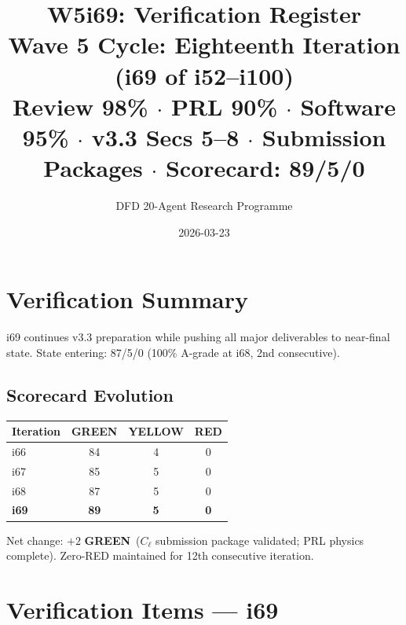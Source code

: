 \documentclass[11pt,a4paper]{article}
\title{\Large W5i69: Verification Register\\[6pt]
\normalsize Wave 5 Cycle: Eighteenth Iteration (i69 of i52--i100)\\[6pt]
Review 98\% $\cdot$ PRL 90\% $\cdot$ Software 95\% $\cdot$ v3.3 Secs 5--8 $\cdot$ Submission Packages $\cdot$ Scorecard: 89/5/0}
\author{DFD 20-Agent Research Programme}
\date{2026-03-23}
\newcommand{\GREEN}{\textcolor{dfdgreen}{\textbf{GREEN}}}
\begin{document}
\maketitle

\section{Verification Summary}

i69 continues v3.3 preparation while pushing all major deliverables to near-final state. State entering: 87/5/0 (100\% A-grade at i68, 2nd consecutive).

\subsection{Scorecard Evolution}

\begin{center}
\begin{tabular}{lccc}
\toprule
\textbf{Iteration} & \textbf{GREEN} & \textbf{YELLOW} & \textbf{RED} \\
\midrule
i66 & 84 & 4 & 0 \\
i67 & 85 & 5 & 0 \\
i68 & 87 & 5 & 0 \\
\textbf{i69} & \textbf{89} & \textbf{5} & \textbf{0} \\
\bottomrule
\end{tabular}
\end{center}

Net change: $+2$ \GREEN\ ($C_\ell$ submission package validated; PRL physics complete). Zero-RED maintained for 12th consecutive iteration.

\section{Verification Items --- i69}
\end{document}
